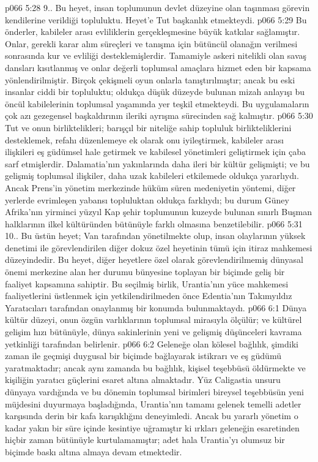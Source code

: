 \vs p066 5:28 9.\bibnobreakspace {}. Bu heyet, insan toplumunun devlet düzeyine olan taşınması görevin kendilerine verildiği topluluktu. Heyet’e Tut başkanlık etmekteydi.
\vs p066 5:29 Bu önderler, kabileler arası evliliklerin gerçekleşmesine büyük katkılar sağlamıştır. Onlar, gerekli karar alım süreçleri ve tanışma için bütüncül olanağın verilmesi sonrasında kur ve evliliği desteklemişlerdir. Tamamiyle askeri nitelikli olan savaş dansları kısıtlanmış ve onlar değerli toplumsal amaçlara hizmet eden bir kapsama yönlendirilmiştir. Birçok çekişmeli oyun onlarla tanıştırılmıştır; ancak bu eski insanlar ciddi bir topluluktu; oldukça düşük düzeyde bulunan mizah anlayışı bu öncül kabilelerinin toplumsal yaşamında yer teşkil etmekteydi. Bu uygulamaların çok azı gezegensel başkaldırının ileriki ayrışma sürecinden sağ kalmıştır.
\vs p066 5:30 Tut ve onun birliktelikleri; barışçıl bir niteliğe sahip topluluk birlikteliklerini desteklemek, refahı düzenlemeye ek olarak onu iyileştirmek, kabileler arası ilişkileri eş güdümsel hale getirmek ve kabilesel yönetimleri geliştirmek için çaba sarf etmişlerdir. Dalamatia’nın yakınlarında daha ileri bir kültür gelişmişti; ve bu gelişmiş toplumsal ilişkiler, daha uzak kabileleri etkilemede oldukça yararlıydı. Ancak Prens’in yönetim merkezinde hüküm süren medeniyetin yöntemi, diğer yerlerde evrimleşen yabansı topluluktan oldukça farklıydı; bu durum Güney Afrika’nın yirminci yüzyıl Kap şehir toplumunun kuzeyde bulunan sınırlı Buşman halklarının ilkel kültüründen bütünüyle farklı olmasına benzetilebilir.
\vs p066 5:31 10.\bibnobreakspace {}. Bu üstün heyet; Van tarafından yönetilmekte olup, insan olaylarının yüksek denetimi ile görevlendirilen diğer dokuz özel heyetinin tümü için itiraz mahkemesi düzeyindedir. Bu heyet, diğer heyetlere özel olarak görevlendirilmemiş dünyasal önemi merkezine alan her durumu bünyesine toplayan bir biçimde geliş bir faaliyet kapsamına sahiptir. Bu seçilmiş birlik, Urantia’nın yüce mahkemesi faaliyetlerini üstlenmek için yetkilendirilmeden önce Edentia’nın Takımyıldız Yaratıcıları tarafından onaylanmış bir konumda bulunmaktaydı.
\vs p066 6:1 Dünya kültür düzeyi, onun özgün varlıklarının toplumsal mirasıyla ölçülür; ve kültürel gelişim hızı bütünüyle, dünya sakinlerinin yeni ve gelişmiş düşünceleri kavrama yetkinliği tarafından belirlenir.
\vs p066 6:2 Geleneğe olan kölesel bağlılık, şimdiki zaman ile geçmişi duygusal bir biçimde bağlayarak istikrarı ve eş güdümü yaratmaktadır; ancak aynı zamanda bu bağlılık, kişisel teşebbüsü öldürmekte ve kişiliğin yaratıcı güçlerini esaret altına almaktadır. Yüz Caligastia unsuru dünyaya vardığında ve bu dönemin toplumsal birimleri bireysel teşebbüsün yeni müjdesini duyurmaya başladığında, Urantia’nın tamamı gelenek temelli adetler karşısında derin bir kafa karışıklığını deneyimledi. Ancak bu yararlı yönetim o kadar yakın bir süre içinde kesintiye uğramıştır ki ırkları geleneğin esaretinden hiçbir zaman bütünüyle kurtulamamıştır; adet hala Urantia’yı olumsuz bir biçimde baskı altına almaya devam etmektedir.
